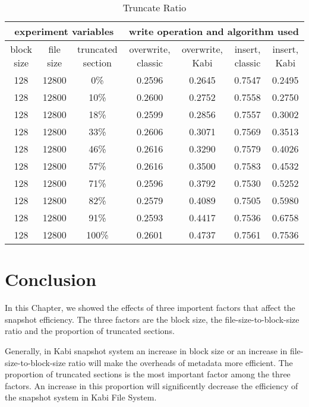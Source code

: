 \begin{lscape} 
\begin{table}
\caption{Truncate Ratio}
\label{tab:truncate_ratio}
\begin{center}
\begin{tabular}{|c|c|c|c|c|c|c|}
\hline
\multicolumn{3}{|c|}{experiment variables} & \multicolumn{4}{c|}{write operation and algorithm used} \\
\hline
block size & file size & truncated section & overwrite, classic & overwrite, Kabi & insert, classic & insert, Kabi\\
\hline
128 & 12800 & 0\% & 0.2596 & 0.2645 & 0.7547 & 0.2495 \\
\hline
128 & 12800 & 10\% & 0.2600 & 0.2752 & 0.7558 & 0.2750 \\
\hline
128 & 12800 & 18\% & 0.2599 & 0.2856 & 0.7557 & 0.3002 \\
\hline
128 & 12800 & 33\% & 0.2606 & 0.3071 & 0.7569 & 0.3513 \\
\hline
128 & 12800 & 46\% & 0.2616 & 0.3290 & 0.7579 & 0.4026 \\
\hline
128 & 12800 & 57\% & 0.2616 & 0.3500 & 0.7583 & 0.4532 \\
\hline
128 & 12800 & 71\% & 0.2596 & 0.3792 & 0.7530 & 0.5252 \\
\hline
128 & 12800 & 82\% & 0.2579 & 0.4089 & 0.7505 & 0.5980 \\
\hline
128 & 12800 & 91\% & 0.2593 & 0.4417 & 0.7536 & 0.6758 \\
\hline
128 & 12800 & 100\% & 0.2601 & 0.4737 & 0.7561 & 0.7536 \\
\hline
\end{tabular}
\end{center}
\end{table}
\end{lscape}

\section{Conclusion}

    In this Chapter, we showed the effects of three importent factors that affect the snapshot efficiency. The three factors are the block size, the file-size-to-block-size ratio and the proportion of truncated sections.

    Generally, in Kabi snapshot system an increase in block size or an increase in file-size-to-block-size ratio will make the overheads of metadata more efficient. The proportion of truncated sections is the most important factor among the three factors. An increase in this proportion will significently decrease the efficiency of the snapshot system in Kabi File System.
